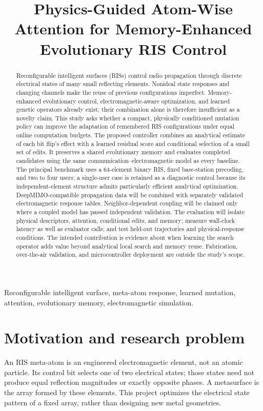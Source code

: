 \documentclass[conference]{IEEEtran}
\title{Physics-Guided Atom-Wise Attention for Memory-Enhanced Evolutionary RIS Control}
\author{\IEEEauthorblockN{Research Proposal}
\IEEEauthorblockA{Simulation-based study; planned duration: 9--12 months\\Revised 21 October 2026}}
\begin{document}
\raggedbottom
\maketitle
\begin{abstract}
Reconfigurable intelligent surfaces (RISs) control radio propagation through discrete electrical states of many small reflecting elements. Nonideal state responses and changing channels make the reuse of previous configurations imperfect. Memory-enhanced evolutionary control, electromagnetic-aware optimization, and learned genetic operators already exist; their combination alone is therefore insufficient as a novelty claim. This study asks whether a compact, physically conditioned mutation policy can improve the adaptation of remembered RIS configurations under equal online computation budgets. The proposed controller combines an analytical estimate of each bit flip's effect with a learned residual score and conditional selection of a small set of edits. It preserves a shared evolutionary memory and evaluates completed candidates using the same communication--electromagnetic model as every baseline. The principal benchmark uses a 64-element binary RIS, fixed base-station precoding, and two to four users; a single-user case is retained as a diagnostic control because its independent-element structure admits particularly efficient analytical optimization. DeepMIMO-compatible propagation data will be combined with separately validated electromagnetic response tables. Neighbor-dependent coupling will be claimed only where a coupled model has passed independent validation. The evaluation will isolate physical descriptors, attention, conditional edits, and memory; measure wall-clock latency as well as evaluator calls; and test held-out trajectories and physical-response conditions. The intended contribution is evidence about when learning the search operator adds value beyond analytical local search and memory reuse. Fabrication, over-the-air validation, and microcontroller deployment are outside the study's scope.
\end{abstract}
\begin{IEEEkeywords}
Reconfigurable intelligent surface, meta-atom response, learned mutation, attention, evolutionary memory, electromagnetic simulation.
\end{IEEEkeywords}
\section{Motivation and research problem}
An RIS meta-atom is an engineered electromagnetic element, not an atomic particle. Its control bit selects one of two electrical states; those states need not produce equal reflection magnitudes or exactly opposite phases. A metasurface is the array formed by these elements. This project optimizes the electrical state pattern of a fixed array, rather than designing new metal geometries.
\end{document}
